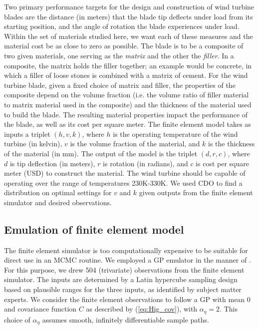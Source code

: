 \documentclass[12pt]{article}
\begin{document}
Two primary performance targets for the design and construction of wind turbine blades are the distance (in meters) that the blade tip deflects under load from its starting position, and the angle of rotation the blade experiences under load.
%
Within the set of materials studied here, we want each of these measures and the material cost be as close to zero as possible.
%
The blade is to be a composite of two given materials, one serving as the \textit{matrix} and the other the \textit{filler}. 
%
In a composite, the matrix holds the filler together; an example would be concrete, in which a filler of loose stones is combined with a matrix of cement.
%
For the wind turbine blade, given a fixed choice of matrix and filler, the properties of the composite depend on the volume fraction (i.e. the volume ratio of filler material to matrix material used in the composite) and the thickness of the material used to build the blade. 
%
The resulting material properties impact the performance of the blade, as well as its cost per square meter. 
%
The finite element model takes as inputs a triplet $(h,v,k)$, where $h$ is the operating temperature of the wind turbine (in kelvin), $v$ is the volume fraction of the material, and $k$ is the thickness of the material (in mm). 
%
The output of the model is the triplet $(d,r,c)$, where $d$ is tip deflection (in meters), $r$ is rotation (in radians), and $c$ is cost per square meter (USD) to construct the material.
% 
The wind turbine should be capable of operating over the range of temperatures 230K-330K. 
%
We used CDO to find a distribution on optimal settings for $v$ and $k$ given outputs from the finite element simulator and desired observations.

\subsection{Emulation of finite element model}\label{emulator}
The finite element simulator is too computationally expensive to be suitable for direct use in an MCMC routine. 
%
We employed a GP emulator in the manner of \cite{Williams2006}. 
%
For this purpose, we drew 504 (trivariate) observations from the finite element simulator. 
%
The inputs are determined by a Latin hypercube sampling design \citep{McKay1979} based on plausible ranges for the three inputs, as identified by subject matter experts.
%
We consider the finite element observations to follow a GP with mean 0 and covariance function $C$ as described by (\ref{eq:Hig_cov}), with $\alpha_\eta=2$. 
%
This choice of $\alpha_\eta$ assumes smooth, infinitely differentiable sample paths. 
%
\end{document}

